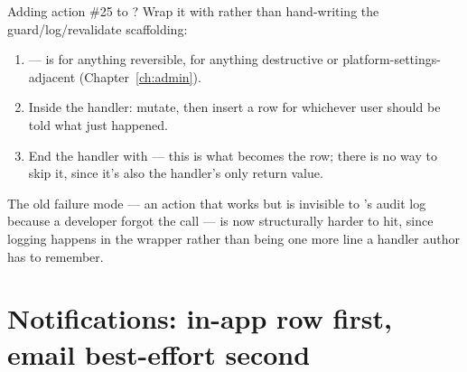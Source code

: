 \begin{olkhowto}
Adding action \#25 to ? Wrap it with  rather than hand-writing the guard/log/revalidate scaffolding:
\begin{enumerate}
  \item {} —  is  for anything reversible,  for anything destructive or platform-settings-adjacent (Chapter~\ref{ch:admin}).
  \item Inside the handler: mutate, then insert a  row for whichever user should be told what just happened.
  \item End the handler with  — this is what becomes the  row; there is no way to skip it, since it's also the handler's only return value.
\end{enumerate}
The old failure mode — an action that works but is invisible to 's audit log because a developer forgot the  call — is now structurally harder to hit, since logging happens in the wrapper rather than being one more line a handler author has to remember.
\end{olkhowto}

\section{Notifications: in-app row first, email best-effort second}

